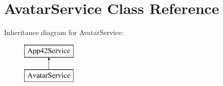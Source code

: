 \hypertarget{class_avatar_service}{\section{Avatar\+Service Class Reference}
\label{class_avatar_service}
}
Inheritance diagram for Avatar\+Service\+:\begin{figure}[H]
\begin{center}
\leavevmode
\includegraphics[height=2.000000cm]{class_avatar_service}
\end{center}
\end{figure}
